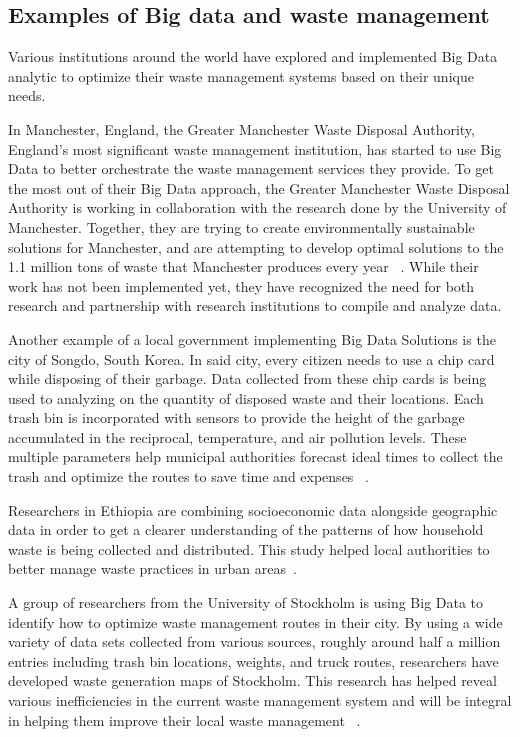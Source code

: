 \documentclass[sigconf]{acmart}
\begin{document}
\subsection{ Examples of Big data and waste management}

Various institutions around the world have explored and implemented Big Data analytic to optimize their waste management systems based on their unique needs.

In Manchester, England, the Greater Manchester Waste Disposal Authority, England's most significant waste management institution, has started to use Big Data to better orchestrate the waste management services they provide. To get the most out of their Big Data approach, the Greater Manchester Waste Disposal Authority is working in collaboration with the research done by the University of Manchester. Together, they are trying to create environmentally sustainable solutions for Manchester, and are attempting to develop optimal solutions to the 1.1 million tons of waste that Manchester produces every year ~\cite{markvan2016}.   While their work has not been implemented yet, they have recognized the need for both research and partnership with research institutions to compile and analyze data.

Another example of a local government implementing Big Data Solutions is the city of  Songdo, South Korea. In said city, every citizen needs to use a chip card while disposing of their garbage. Data collected from these chip cards is being used to analyzing on the quantity of disposed waste and their locations. Each trash bin is incorporated with sensors to provide the height of the garbage accumulated in the reciprocal, temperature, and air pollution levels. These multiple parameters help municipal authorities forecast ideal times to collect the trash and optimize the routes to save time and expenses ~\cite{markvan2016}.

Researchers in Ethiopia are combining socioeconomic data alongside geographic data in order to get a clearer understanding of the patterns of how household waste is being collected and distributed. This study helped local authorities to better manage waste practices in urban areas~\cite{markvan2016}. 

A group of researchers from the University of Stockholm is using Big Data to identify how to optimize waste management routes in their city. By using a wide variety of data sets collected from various sources, roughly around half a million entries including trash bin locations, weights, and truck routes, researchers have developed waste generation maps of Stockholm. This research has helped reveal various inefficiencies in the current waste management system and will be integral in helping them improve their local waste management ~\cite{markvan2016}.
\end{document}
